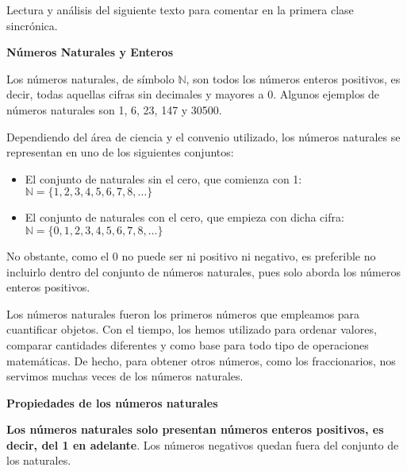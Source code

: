 Lectura y análisis del siguiente texto para comentar en la primera clase sincrónica.

\bigskip

\begin{center}
	\begin{minipage}{0.8\linewidth}
		\begin{center}
			\bfseries
			Números Naturales y Enteros
		\end{center}
		
		Los números naturales, de símbolo $\mathbb{N}$, son todos los números enteros positivos, es decir, todas aquellas cifras sin decimales y mayores a 0. Algunos ejemplos de números naturales son 1, 6, 23, 147 y 30500.
		
		Dependiendo del área de ciencia y el convenio utilizado, los números naturales se representan en uno de los siguientes conjuntos:
		\begin{itemize}
			\item El conjunto de naturales sin el cero, que comienza con 1: $\mathbb{N} = \{ 1, 2, 3, 4, 5, 6, 7, 8, \dots \}$
			\item El conjunto de naturales con el cero, que empieza con dicha cifra: $\mathbb{N} = \{ 0, 1, 2, 3, 4, 5, 6, 7, 8, \dots \}$
		\end{itemize}
		
		No obstante, como el 0 no puede ser ni positivo ni negativo, es preferible no incluirlo dentro del conjunto de números naturales, pues solo aborda los números enteros positivos.
		
		Los números naturales fueron los primeros números que empleamos para cuantificar objetos. Con el tiempo, los hemos utilizado para ordenar valores, comparar cantidades diferentes y como base para todo tipo de operaciones matemáticas. De hecho, para obtener otros números, como los fraccionarios, nos servimos muchas veces de los números naturales.
	\end{minipage}
	
		\bigskip
		
		\begin{minipage}{0.8\linewidth}
			\begin{center}
				\bfseries
				Propiedades de los números naturales
			\end{center}
			
			\textbf{Los números naturales solo presentan números enteros positivos, es decir, del 1 en adelante}. Los números negativos quedan fuera del conjunto de los naturales.
			

\end{minipage}
\end{center}
